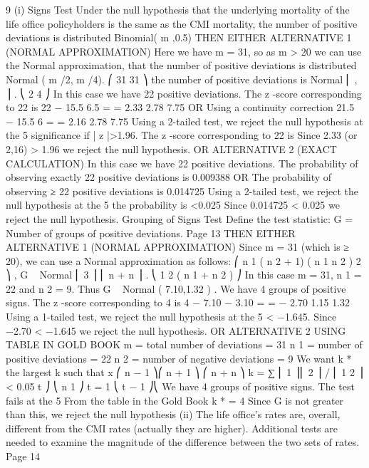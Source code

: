\documentclass[a4paper,12pt]{article}
\begin{document}
\begin{enumerate}
9
(i)
Signs Test
Under the null hypothesis that the underlying mortality of the life office policyholders
is the same as the CMI mortality,
the number of positive deviations is distributed Binomial( m ,0.5)
THEN EITHER ALTERNATIVE 1 (NORMAL APPROXIMATION)
Here we have m = 31, so as m > 20 we can use the Normal approximation, that the
number of positive deviations is distributed Normal ( m /2, m /4).
⎛ 31 31 ⎞
the number of positive deviations is Normal ⎜ , ⎟ .
⎝ 2 4 ⎠
In this case we have 22 positive deviations.
The z -score corresponding to 22 is
22 − 15.5 6.5
=
= 2.33
2.78
7.75
OR Using a continuity correction
21.5 − 15.5
6
=
= 2.16
2.78
7.75
Using a 2-tailed test, we reject the null hypothesis at the 5%
significance if | z |>1.96.
The z -score corresponding to 22 is
Since 2.33 (or 2,16) > 1.96 we reject the null hypothesis.
OR ALTERNATIVE 2 (EXACT CALCULATION)
In this case we have 22 positive deviations.
The probability of observing exactly 22 positive deviations is 0.009388
OR
The probability of observing ≥ 22 positive deviations is 0.014725
Using a 2-tailed test, we reject the null hypothesis at the 5%
the probability is <0.025
Since 0.014725 < 0.025 we reject the null hypothesis.
Grouping of Signs Test
Define the test statistic:
G = Number of groups of positive deviations.
Page 13 %
THEN EITHER ALTERNATIVE 1 (NORMAL APPROXIMATION)
Since m = 31 (which is ≥ 20), we can use a Normal approximation as follows:
⎛ n 1 ( n 2 + 1) ( n 1 n 2 ) 2 ⎞
,
G ~ Normal ⎜
3 ⎟
⎜ n + n
⎟ .
⎝ 1 2 ( n 1 + n 2 ) ⎠
In this case m = 31, n 1 = 22 and n 2 = 9.
Thus G ~ Normal ( 7.10,1.32 ) .
We have 4 groups of positive signs.
The z -score corresponding to 4 is
4 − 7.10 − 3.10
=
= − 2.70
1.15
1.32
Using a 1-tailed test, we reject the null hypothesis at the 5%
< −1.645.
Since −2.70 < −1.645 we reject the null hypothesis.
OR ALTERNATIVE 2 USING TABLE IN GOLD BOOK
m = total number of deviations = 31
n 1 = number of positive deviations = 22
n 2 = number of negative deviations = 9
We want k * the largest k such that
x
⎛ n − 1 ⎞⎛ n + 1 ⎞ ⎛ n + n ⎞
k = ∑ ⎜ 1 ⎟⎜ 2 ⎟ / ⎜ 1 2 ⎟ < 0.05
t ⎠ ⎝ n 1 ⎠
t = 1 ⎝ t − 1 ⎠⎝
We have 4 groups of positive signs.
The test fails at the 5%
From the table in the Gold Book k * = 4
Since G is not greater than this, we reject the null hypothesis
(ii)
The life office’s rates are, overall, different from the CMI rates (actually they are
higher).
Additional tests are needed to examine the magnitude of the difference between the
two sets of rates.
Page 14 %

\end{enumerate}
\end{document}
